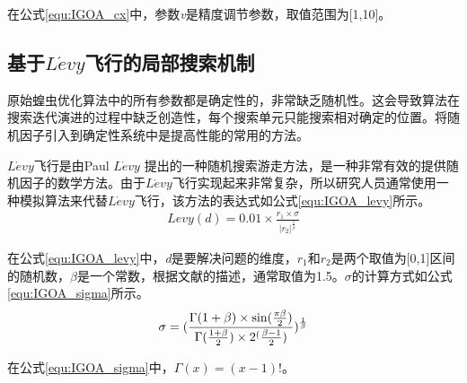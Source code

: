 在公式\ref{equ:IGOA_cx}中，参数\emph{v}是精度调节参数，取值范围为[1,10]。
\subsection{基于$L\acute{e}vy$飞行的局部搜索机制}

原始蝗虫优化算法中的所有参数都是确定性的，非常缺乏随机性。这会导致算法在搜索迭代演进的过程中缺乏创造性，每个搜索单元只能搜索相对确定的位置。将随机因子引入到确定性系统中是提高性能的常用的方法。

$L\acute{e}vy$飞行是由Paul $L\acute{e}vy$ \cite {mirjalili2016dragonfly}提出的一种随机搜索游走方法，是一种非常有效的提供随机因子的数学方法。由于$L\acute{e}vy$飞行实现起来非常复杂，所以研究人员通常使用一种模拟算法来代替$L\acute{e}vy$飞行，该方法的表达式如公式\ref{equ:IGOA_levy}所示。
\begin{eqnarray}\label{equ:IGOA_levy}
	Levy(d)=0.01\times\frac{r_1\times\sigma}{|r_2|^{\frac{1}{\beta}}}
\end{eqnarray}

在公式\ref{equ:IGOA_levy}中，\emph{d}是要解决问题的维度，$r_1$和$r_2$是两个取值为[0,1]区间的随机数，$\beta$是一个常数，根据文献\cite{mirjalili2016dragonfly}的描述，通常取值为1.5。$\sigma$的计算方式如公式\ref{equ:IGOA_sigma}所示。
\begin{eqnarray}\label{equ:IGOA_sigma}
	\sigma=(\frac{\Gamma(1+\beta)\times \sin(\frac{\pi\beta}{2})}{\Gamma(\frac{1+\beta}{2})\time\beta\times2^(\frac{\beta-1}{2})})^\frac{1}{\beta}
\end{eqnarray}

在公式\ref{equ:IGOA_sigma}中，$\Gamma(x)=(x-1)!$。

